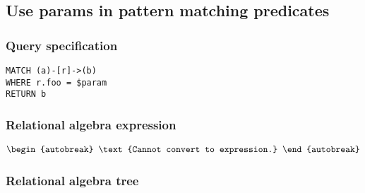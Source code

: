 
\subsection{Use params in pattern matching predicates}

\subsubsection*{Query specification}

\begin{lstlisting}
MATCH (a)-[r]->(b)
WHERE r.foo = $param
RETURN b
\end{lstlisting}

\subsubsection*{Relational algebra expression}

\begin{align*}
\begin{autobreak}
\text{Cannot convert to expression.}
\end{autobreak}
\end{align*}

\subsubsection*{Relational algebra tree}


